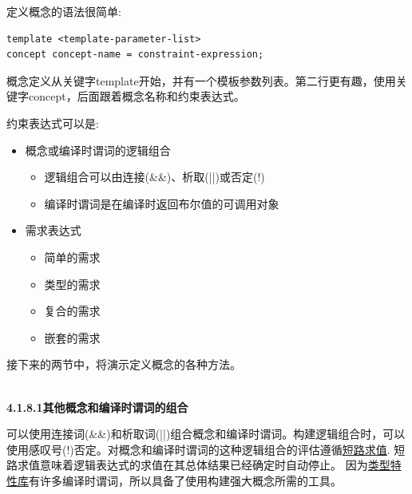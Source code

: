 定义概念的语法很简单:

\begin{lstlisting}[style=styleCXX]
template <template-parameter-list>
concept concept-name = constraint-expression;
\end{lstlisting}

概念定义从关键字template开始，并有一个模板参数列表。第二行更有趣，使用关键字concept，后面跟着概念名称和约束表达式。

约束表达式可以是:

\begin{itemize}
\item
概念或编译时谓词的逻辑组合

\begin{itemize}
\item
逻辑组合可以由连接(\&\&)、析取(||)或否定(!)

\item
编译时谓词是在编译时返回布尔值的可调用对象
\end{itemize}

\item
需求表达式
\begin{itemize}
\item
简单的需求

\item
类型的需求

\item
复合的需求

\item
嵌套的需求
\end{itemize}
\end{itemize}

接下来的两节中，将演示定义概念的各种方法。

\hspace*{\fill} \\ %
\noindent
\textbf{4.1.8.1\hspace{0.2cm}其他概念和编译时谓词的组合}

可以使用连接词(\&\&)和析取词(||)组合概念和编译时谓词。构建逻辑组合时，可以使用感叹号(!)否定。对概念和编译时谓词的这种逻辑组合的评估遵循\href{https://en.wikipedia.org/wiki/Short-circuit_evaluation}{短路求值}. 短路求值意味着逻辑表达式的求值在其总体结果已经确定时自动停止。
因为\href{https://en.cppreference.com/w/cpp/header/type_traits}{类型特性库}有许多编译时谓词，所以具备了使用构建强大概念所需的工具。

